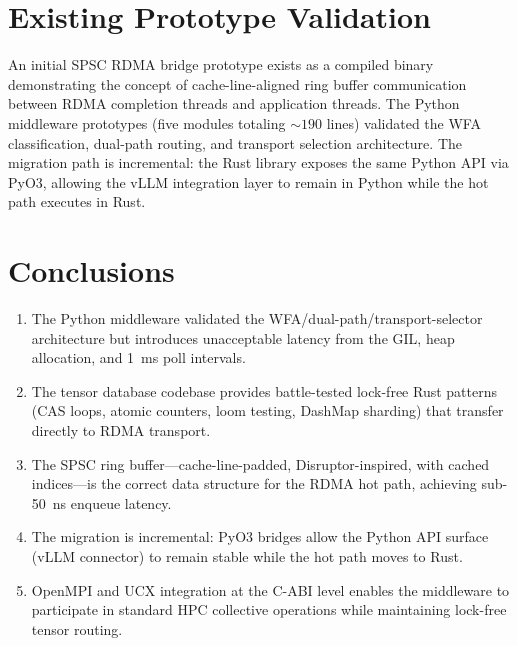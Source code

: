 \documentclass[11pt,letterpaper]{article}
\begin{document}
\section{Existing Prototype Validation}

An initial SPSC RDMA bridge prototype exists as a compiled binary demonstrating the concept of cache-line-aligned ring buffer communication between RDMA completion threads and application threads. The Python middleware prototypes (five modules totaling ${\sim}190$ lines) validated the WFA classification, dual-path routing, and transport selection architecture. The migration path is incremental: the Rust library exposes the same Python API via PyO3, allowing the vLLM integration layer to remain in Python while the hot path executes in Rust.

\section{Conclusions}

\begin{enumerate}
    \item The Python middleware validated the WFA/dual-path/transport-selector architecture but introduces unacceptable latency from the GIL, heap allocation, and 1~ms poll intervals.

    \item The tensor database codebase provides battle-tested lock-free Rust patterns (CAS loops, atomic counters, loom testing, DashMap sharding) that transfer directly to RDMA transport.

    \item The SPSC ring buffer---cache-line-padded, Disruptor-inspired, with cached indices---is the correct data structure for the RDMA hot path, achieving sub-50~ns enqueue latency.

    \item The migration is incremental: PyO3 bridges allow the Python API surface (vLLM connector) to remain stable while the hot path moves to Rust.

    \item OpenMPI and UCX integration at the C-ABI level enables the middleware to participate in standard HPC collective operations while maintaining lock-free tensor routing.
\end{enumerate}



\end{document}
